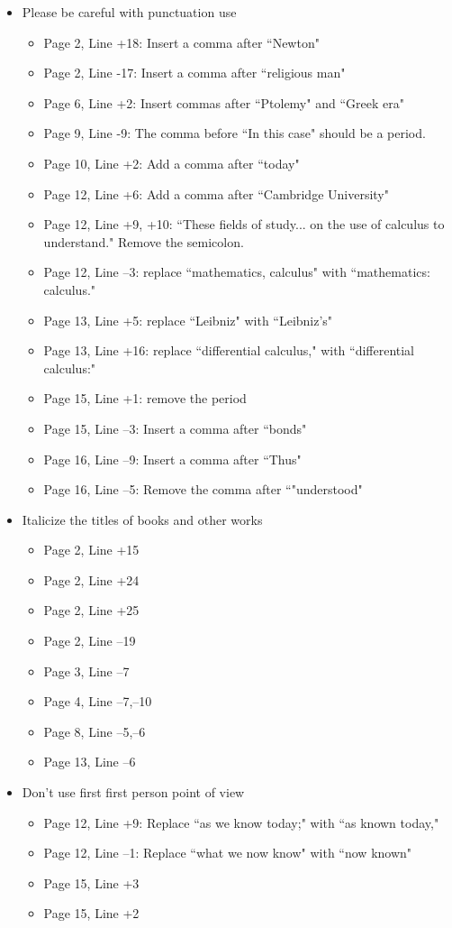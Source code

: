 \documentclass[11pt]{article}
\begin{document}
\begin{itemize}
	\item Please be careful with punctuation use
	\begin{itemize}
		\item Page 2, Line +18: Insert a comma after ``Newton"
		\item Page 2, Line -17: Insert a comma after ``religious man"
		\item Page 6, Line +2: Insert commas after ``Ptolemy" and ``Greek era"
		\item Page 9, Line -9: The comma before ``In this case" should be a period.
		\item Page 10, Line +2: Add a comma after ``today"
		\item Page 12, Line +6: Add a comma after ``Cambridge University"
		\item Page 12, Line +9, +10: ``These fields of study... on the use of calculus to understand." Remove the semicolon. 
		\item Page 12, Line --3: replace ``mathematics, calculus" with ``mathematics: calculus."
		\item Page 13, Line +5: replace ``Leibniz" with ``Leibniz’s"
		\item Page 13, Line +16: replace ``differential calculus," with ``differential calculus:"
		\item Page 15, Line +1: remove the period
		\item Page 15, Line --3: Insert a comma after ``bonds"
		\item Page 16, Line --9: Insert a comma after ``Thus"
		\item Page 16, Line --5: Remove the comma after ``"understood"
	\end{itemize}
	
	\item Italicize the titles of books and other works
	\begin{itemize}
		\item Page 2, Line +15
		\item Page 2, Line +24
		\item Page 2, Line +25
		\item Page 2, Line --19
		\item Page 3, Line --7
		\item Page 4, Line --7,--10
		\item Page 8, Line --5,--6
		\item Page 13, Line --6		
	\end{itemize}
	
	\item Don't use first first person point of view
	\begin{itemize}
		\item Page 12, Line +9: Replace ``as we know today;" with ``as known today,"
		\item Page 12, Line --1: Replace ``what we now know" with ``now known"
		\item Page 15, Line +3
		\item Page 15, Line +2
	\end{itemize}
	

\end{itemize}
\end{document}
